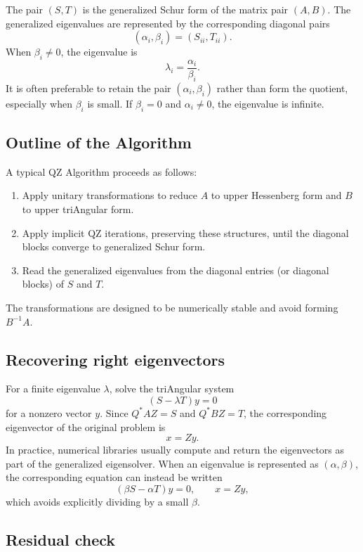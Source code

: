 \documentclass[a4paper, 10pt, onepage]{elegantbook}
\begin{document}
{The pair \((S,T)\) is the generalized Schur form of the matrix pair
\((A,B)\). The generalized eigenvalues are represented by the
corresponding diagonal pairs
\[
(\alpha_i,\beta_i)=(S_{ii},T_{ii}).
\]
When \(\beta_i\ne0\), the eigenvalue is
\[
\lambda_i=\frac{\alpha_i}{\beta_i}.
\]
It is often preferable to retain the pair \((\alpha_i,\beta_i)\)
rather than form the quotient, especially when \(\beta_i\) is small.
If \(\beta_i=0\) and \(\alpha_i\ne0\), the eigenvalue is infinite.

\subsection{Outline of the Algorithm}

\noindent

A typical QZ Algorithm proceeds as follows:
\begin{enumerate}
  \item Apply unitary transformations to reduce \(A\) to
        upper Hessenberg form and \(B\) to upper triAngular form.
  \item Apply implicit QZ iterations, preserving these structures,
        until the diagonal blocks converge to generalized Schur form.
  \item Read the generalized eigenvalues from the diagonal entries
        (or diagonal blocks) of \(S\) and \(T\).
\end{enumerate}
The transformations are designed to be numerically stable and avoid
forming \(B^{-1}A\).

\subsection{Recovering right eigenvectors}

\noindent

For a finite eigenvalue \(\lambda\), solve the triAngular system
\[
(S-\lambda T)y=0
\]
for a nonzero vector \(y\). Since \(Q^*AZ=S\) and \(Q^*BZ=T\),
the corresponding eigenvector of the original problem is
\[
x=Zy.
\]
In practice, numerical libraries usually compute and return the
eigenvectors as part of the generalized eigensolver. When an eigenvalue
is represented as \((\alpha,\beta)\), the corresponding equation can
instead be written
\[
(\beta S-\alpha T)y=0,
\qquad x=Zy,
\]
which avoids explicitly dividing by a small \(\beta\).

\subsection{Residual check}

}
\end{document}
